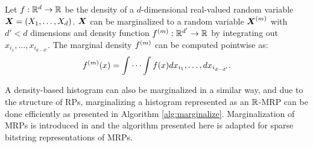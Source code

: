 \documentclass[../histograms.tex]{subfiles}
\begin{document}
  Let $f: \mathbb{R}^d \to \mathbb{R}$ be the density of a $d$-dimensional real-valued
  random variable $\X = (X_1, \dots, X_d)$.
  $\X$ can be marginalized to a random variable $\X \ind m$ with 
  $d' < d$ dimensions and density function
  $f ^{(m)} : \mathbb{R}^{d'} \to \mathbb{R}$
  by integrating out $x_{i_1}, \dots, x_{i_{d - d'}}$.
  The marginal density $f ^{(m)}$ can be computed pointwise as:
  \[ f ^{(m)} (x) = \idotsint f(x) dx_{i_1}, \dots, dx_{i_{d - d'}} .\]

  A density-based histogram can also be marginalized in a similar way,
  and due to the structure of RPs, marginalizing a histogram
  represented as an $\mathbb{R}$-MRP can be done efficiently as
  presented in Algorithm \ref{alg:marginalize}.
  Marginalization of MRPs is introduced in \cite{mrp-raaz-harlow-tucker} and 
  the algorithm presented here is adapted for 
  sparse bitstring representations of MRPs.
\end{document}
